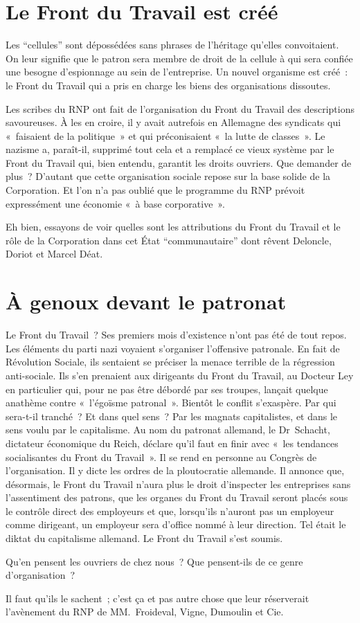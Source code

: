 \documentclass[french,twoside]{book} %
\begin{document}
\section[Le Front du Travail est créé]{Le Front du Travail est créé}
\noindent Les “cellules” sont dépossédées sans phrases de l’héritage qu’elles convoitaient. On leur signifie que le patron sera membre de droit de la cellule à qui sera confiée une besogne d’espionnage au sein de l’entreprise. Un nouvel organisme est créé : le Front du Travail qui a pris en charge les biens des organisations dissoutes.\par
Les scribes du RNP ont fait de l’organisation du Front du Travail des descriptions savoureuses. À les en croire, il y avait autrefois en Allemagne des syndicats qui « faisaient de la politique » et qui préconisaient « la lutte de classes ». Le nazisme a, paraît-il, supprimé tout cela et a remplacé ce vieux système par le Front du Travail qui, bien entendu, garantit les droits ouvriers. Que demander de plus ? D’autant que cette organisation sociale repose sur la base solide de la Corporation. Et l’on n’a pas oublié que le programme du RNP prévoit expressément une économie « à base corporative ».\par
Eh bien, essayons de voir quelles sont les attributions du Front du Travail et le rôle de la Corporation dans cet État “communautaire” dont rêvent Deloncle, Doriot et Marcel Déat.
\section[À genoux devant le patronat]{À genoux devant le patronat}
\noindent Le Front du Travail ? Ses premiers mois d’existence n’ont pas été de tout repos. Les éléments du parti nazi voyaient s’organiser l’offensive patronale. En fait de Révolution Sociale, ils sentaient se préciser la menace terrible de la régression anti-sociale. Ils s’en prenaient aux dirigeants du Front du Travail, au Docteur Ley en particulier qui, pour ne pas être débordé par ses troupes, lançait quelque anathème contre « l’égoïsme patronal ». Bientôt le conflit s’exaspère. Par qui sera-t-il tranché ? Et dans quel sens ? Par les magnats capitalistes, et dans le sens voulu par le capitalisme. Au nom du patronat allemand, le Dr Schacht, dictateur économique du Reich, déclare qu’il faut en finir avec « les tendances socialisantes du Front du Travail ». Il se rend en personne au Congrès de l’organisation. Il y dicte les ordres de la ploutocratie allemande. Il annonce que, désormais, le Front du Travail n’aura plus le droit d’inspecter les entreprises sans l’assentiment des patrons, que les organes du Front du Travail seront placés sous le contrôle direct des employeurs et que, lorsqu’ils n’auront pas un employeur comme dirigeant, un employeur sera d’office nommé à leur direction. Tel était le diktat du capitalisme allemand. Le Front du Travail s’est soumis.\par
Qu’en pensent les ouvriers de chez nous ? Que pensent-ils de ce genre d’organisation ?\par
Il faut qu’ils le sachent ; c’est ça et pas autre chose que leur réserverait l’avènement du RNP de MM. Froideval, Vigne, Dumoulin et Cie.
\end{document}
